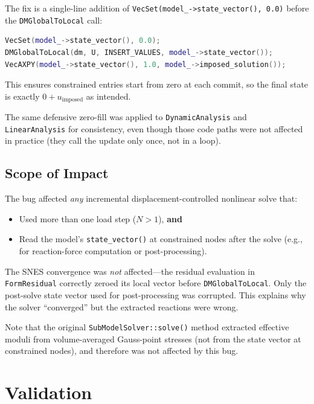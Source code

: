 The fix is a single-line addition of \texttt{VecSet(model\_->state\_vector(), 0.0)}
before the \texttt{DMGlobalToLocal} call:

\begin{lstlisting}[language=C++, basicstyle=\ttfamily\small]
VecSet(model_->state_vector(), 0.0);
DMGlobalToLocal(dm, U, INSERT_VALUES, model_->state_vector());
VecAXPY(model_->state_vector(), 1.0, model_->imposed_solution());
\end{lstlisting}

This ensures constrained entries start from zero at each commit,
so the final state is exactly $0 + u_{\text{imposed}}$ as intended.

The same defensive zero-fill was applied to
\texttt{DynamicAnalysis} and \texttt{LinearAnalysis} for consistency,
even though those code paths were not affected in practice (they
call the update only once, not in a loop).

\subsection{Scope of Impact}

The bug affected \emph{any} incremental displacement-controlled nonlinear
solve that:
\begin{itemize}
  \item Used more than one load step ($N > 1$), \textbf{and}
  \item Read the model's \texttt{state\_vector()} at constrained nodes
        after the solve (e.g., for reaction-force computation or
        post-processing).
\end{itemize}

The SNES convergence was \emph{not} affected---the residual evaluation
in \texttt{FormResidual} correctly zeroed its local vector before
\texttt{DMGlobalToLocal}.  Only the post-solve state vector used for
post-processing was corrupted.  This explains why the solver ``converged''
but the extracted reactions were wrong.

Note that the original \texttt{SubModelSolver::solve()} method extracted
effective moduli from volume-averaged Gauss-point stresses (not from
the state vector at constrained nodes), and therefore was not affected
by this bug.


\section{Validation}
\label{sec:reinf-validation}

